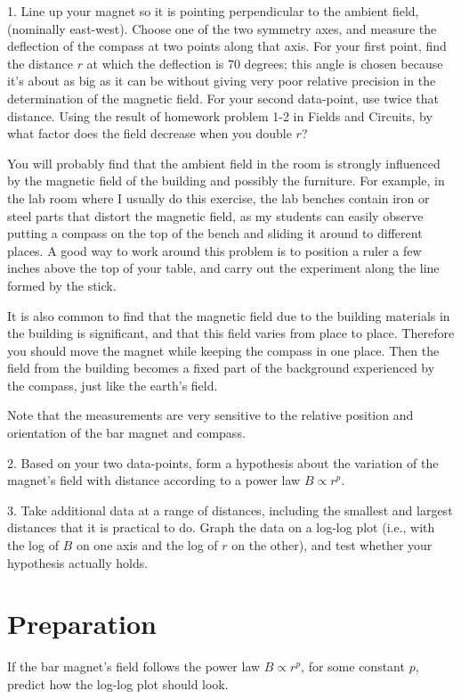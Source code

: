 1. Line up your magnet so it is pointing perpendicular to the ambient field,
(nominally east-west). Choose one
of the two symmetry axes, and measure the
deflection of the compass at two points along that axis.
For your first point, find the
distance $r$ at which the deflection is 70 degrees; this angle is chosen because
it's about as big as it can be without giving very poor relative precision 
in the determination of the magnetic field. For your second data-point,
use twice that distance. Using the result of homework problem 
1-2 in Fields and Circuits, by what factor does the field decrease
when you double $r$?

You will probably find that the ambient field in the room is strongly
influenced by the magnetic field of the building and possibly the
furniture.  For example, in the lab room where I usually do this
exercise, the lab benches contain iron or steel parts that distort the
magnetic field, as my students can easily observe putting a compass on
the top of the bench and sliding it around to different places. 
A good way to work around this problem is to position a ruler a few 
inches above the top of your table, and carry out the experiment along the line
formed by the stick.

It is also common to find that the
magnetic field due to the building materials in the building is
significant, and that this field varies from place to place.  Therefore you
should move the magnet while keeping the compass in one place.  Then
the field from the building becomes a fixed part of the background
experienced by the compass, just like the earth's field. 

Note that the measurements are very sensitive to the
relative position and orientation of the bar magnet and
compass. 

2. Based on your two data-points, form a hypothesis about the variation
of the magnet's field with distance according to a power law $B\propto
r^p$. 

3. Take additional data at a range of distances, including the smallest
and largest distances that it is practical to do. Graph the data on a log-log
plot (i.e., with the log of $B$ on one axis and the log of $r$ on the other),
and test whether your hypothesis actually holds.

\section*{Preparation}

If the bar magnet's field follows the power law $B\propto r^p$, for some constant $p$,
predict how the log-log plot should look.


